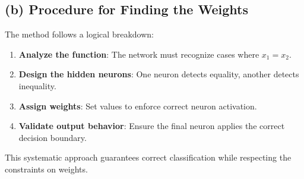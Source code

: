\documentclass[a4paper,11pt,oneside]{book}
\begin{document}
\begin{enumerate}
\begin{solution}
                \subsection*{(b) Procedure for Finding the Weights}
                The method follows a logical breakdown:
                \begin{enumerate}
                    \item \textbf{Analyze the function}: The network must recognize cases where $x_1 = x_2$.
                    \item \textbf{Design the hidden neurons}: One neuron detects equality, another detects inequality.
                    \item \textbf{Assign weights}: Set values to enforce correct neuron activation.
                    \item \textbf{Validate output behavior}: Ensure the final neuron applies the correct decision boundary.
                \end{enumerate}
                
                This systematic approach guarantees correct classification while respecting the constraints on weights.
            \end{solution}  
    \end{enumerate}

\clearpage
\end{document}
